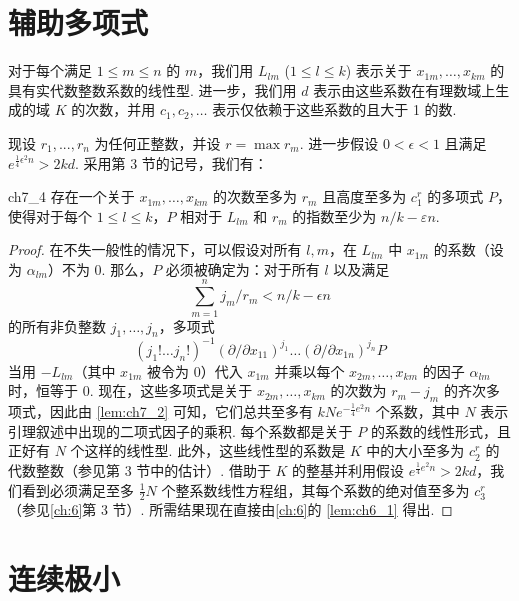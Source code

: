 \section{辅助多项式}\label{sec:ch7_6}

对于每个满足 $1 \le m \le n$ 的 $m$，我们用 $L_{lm}$ ($1 \le l \le k$) 表示关于 $x_{1m}, \ldots, x_{km}$ 的具有实代数整数系数的线性型. 进一步，我们用 $d$ 表示由这些系数在有理数域上生成的域 $K$ 的次数，并用 $c_1, c_2, \ldots$ 表示仅依赖于这些系数的且大于 1 的数.

现设 $r_1, ..., r_n$ 为任何正整数，并设 $r = \max r_m$. 进一步假设 $0 < \epsilon < 1$ 且满足 $e^{\frac{1}{4}\epsilon^2n} > 2kd$. 采用第 3 节的记号，我们有：

\begin{mylemma}{}{ch7_4}
存在一个关于 $x_{1m}, \ldots, x_{km}$ 的次数至多为 $r_m$ 且高度至多为 $c_1^r$ 的多项式 $P$，使得对于每个 $1 \le l \le k$，$P$ 相对于 $L_{lm}$ 和 $r_m$ 的指数至少为 $n/k - \varepsilon n$.
\end{mylemma}

\begin{proof}
在不失一般性的情况下，可以假设对所有 $l, m$，在 $L_{lm}$ 中 $x_{1m}$ 的系数（设为 $\alpha_{lm}$）不为 0. 那么，$P$ 必须被确定为：对于所有 $l$ 以及满足
\[\sum_{m=1}^{n} j_m/r_m < n/k - \epsilon n\]
的所有非负整数 $j_1, \ldots, j_n$，多项式
\[(j_1! \dots j_n!)^{-1} (\partial/\partial x_{11})^{j_1} \dots (\partial/\partial x_{1n})^{j_n} P\]
当用 $-L_{lm}$（其中 $x_{1m}$ 被令为 0）代入 $x_{1m}$ 并乘以每个 $x_{2m}, \ldots, x_{km}$ 的因子 $\alpha_{lm}$ 时，恒等于 0. 现在，这些多项式是关于 $x_{2m}, \ldots, x_{km}$ 的次数为 $r_m - j_m$ 的齐次多项式，因此由 \autoref{lem:ch7_2} 可知，它们总共至多有 $kNe^{-\frac{1}{4}e^2n}$ 个系数，其中 $N$ 表示引理叙述中出现的二项式因子的乘积. 每个系数都是关于 $P$ 的系数的线性形式，且正好有 $N$ 个这样的线性型. 此外，这些线性型的系数是 $K$ 中的大小至多为 $c_2^r$ 的代数整数（参见第 3 节中的估计）. 借助于 $K$ 的整基并利用假设 $e^{\frac{1}{4}e^2n} > 2kd$，我们看到必须满足至多 $\frac{1}{2}N$ 个整系数线性方程组，其每个系数的绝对值至多为 $c_3^r$（参见\autoref{ch:6}第 3 节）. 所需结果现在直接由\autoref{ch:6}的 \autoref{lem:ch6_1} 得出.
\end{proof}

\section{连续极小}\label{sec:ch7_7}

